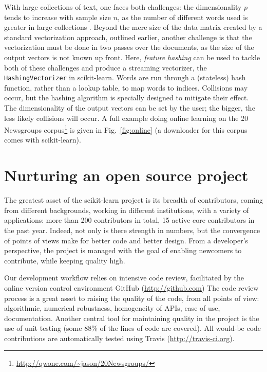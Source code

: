 \documentclass[a4paper]{article}
\begin{document}
With large collections of text, one faces both challenges:
the dimensionality $p$
tends to increase with sample size $n$, as the number of different words used
is greater in large collections \cite[88--89]{manning2009}.
Beyond the mere size of the data matrix
created by a standard vectorization approach, outlined earlier, another challenge
is that the vectorization must be done in two passes over the documents,
as the size of the output vectors is not known up front.
Here, \emph{feature hashing} can be used
to tackle both of these challenges and produce a streaming vectorizer,
the {\tt HashingVectorizer} in scikit-learn.
Words are run through a (stateless) hash function, rather than a lookup table,
to map words to indices.
Collisions may occur, but the hashing algorithm \cite{weinberger2009}
is specially designed to mitigate their effect.
The dimensionality of the output vectors can be set by the user;
the bigger, the less likely collisions will occur.
%
A full example doing online learning on the 20 Newsgroups corpus\footnote{\url{http://qwone.com/~jason/20Newsgroups/}}
is given in Fig.~\ref{fig:online} (a downloader for this corpus comes with scikit-learn).

\section{Nurturing an open source project}

The greatest asset of the scikit-learn project is its breadth of
contributors, coming from different backgrounds, working in different
institutions, with a variety of applications: more than 200 contributors in
total, 15 active core contributors in the past year. Indeed, not only
is there strength in numbers, but the convergence of points of views
make for better code and better design. From a developer's perspective, the
project is managed with the goal of enabling newcomers to contribute,
while keeping quality high.

Our development workflow relies on intensive code review,
facilitated by the online version control environment GitHub (\url{http://github.com})
The code review process is a great asset to
raising the quality of the code, from all points of view: algorithmic,
numerical robustness, homogeneity of APIs, ease of use, documentation.
Another central tool for maintaining quality in the project is the use of
unit testing (some 88\% of the lines of code are covered).
All would-be code contributions are automatically tested using Travis
(\url{http://travis-ci.org}).
\end{document}
